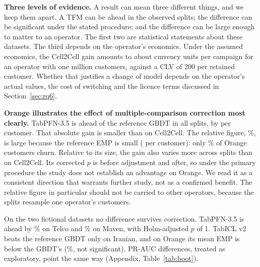 \documentclass[11pt]{article}
\newcommand{\tfm}{TFM\xspace}
\begin{document}
\textbf{Three levels of evidence.} A result can mean three different things, and we keep them apart. A \tfm can be
ahead in the observed splits; the difference can be significant under the stated procedure; and the difference can be
large enough to matter to an operator. The first two are statistical statements about these datasets. The third
depends on the operator's economics. Under the assumed economics, the Cell2Cell gain amounts to about
\perMillionPFNThreeCellTwoCell{} currency units per campaign for an operator with one million customers, against a
CLV of 200 per retained customer. Whether that justifies a change of model depends on the operator's actual values,
the cost of switching and the licence terms discussed in Section~\ref{sec:rq6}.

\textbf{Orange illustrates the effect of multiple-comparison correction most clearly.} TabPFN-3.5 is ahead of the
reference GBDT in all \nSeeds{} splits, by \empAbsPFNThreeOrangeAbs{} per customer. That absolute gain is smaller than on
Cell2Cell. The relative figure, \empPFNThreeOrangeAbs\%, is large because the reference EMP is small
( per customer): only \rateOrange\% of Orange customers churn. Relative to its size, the gain
also varies more across splits than on Cell2Cell. Its corrected $p$ is \nbpPFNThreeOrange{} before adjustment and
\holmPFNThreeOrange{} after, so under the primary procedure the study does not establish an advantage on Orange. We read
it as a consistent direction that warrants further study, not as a confirmed benefit. The relative figure in particular
should not be carried to other operators, because the \nSeeds{} splits resample one operator's customers.

On the two fictional datasets no difference survives correction. TabPFN-3.5 is ahead by \empPFNThreeTelcoAbs\% on Telco
and \empPFNThreeMavenAbs\% on Maven, with Holm-adjusted $p$ of 1. TabICL v2 beats the reference GBDT only on Iranian, and
on Orange its mean EMP is below the GBDT's (\empICLOrange\%, not significant). PR-AUC differences, treated as exploratory,
point the same way (Appendix, Table~\ref{tab:boot}).
\end{document}

